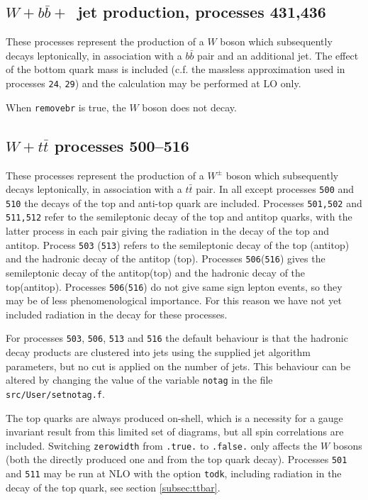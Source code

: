 \documentclass[12pt]{article}
\begin{document}
\subsection{$W+b{\bar b}+$~jet production, processes 431,436}
\label{subsec:wbbjetmassive}

These processes represent the production of a $W$ boson which subsequently
decays leptonically, in association with a $b{\bar b}$ pair and an
additional jet. The effect of the bottom quark mass is included (c.f. the massless approximation
used in processes {\tt 24}, {\tt 29})
and the calculation may be performed at LO only.

When {\tt removebr} is true, the $W$ boson does not decay.

\subsection{$W+t{\bar t}$ processes 500--516}
\label{subsec:wttdecay}

These processes represent the production of a $W^\pm$ boson which subsequently
decays leptonically, in association with a $t{\bar t}$ pair. In all except processes 
{\tt 500} and {\tt 510} the decays of the top and anti-top quark are included.
Processes {\tt 501,502} and {\tt 511,512} refer to the semileptonic decay of the top and antitop quarks,
with the latter process in each pair giving the radiation in the decay of the top and antitop.
Process {\tt 503} ({\tt 513}) refers to the semileptonic decay of the top (antitop)
and the hadronic decay of the antitop (top). Processes {\tt 506}({\tt 516}) gives the semileptonic
decay of the antitop(top) and the hadronic decay of the top(antitop).  Processes {\tt 506}({\tt 516}) 
do not give same sign lepton events, so they may be of less phenomenological importance. For this reason 
we have not yet included radiation in the decay for these processes. 

For processes {\tt 503}, {\tt 506}, {\tt 513}
and {\tt 516} the default behaviour is that the hadronic decay products
are clustered into jets using the supplied jet
algorithm parameters, but no cut is applied on the number of jets.
This behaviour can be altered by changing the value of the
variable {\tt notag} in the file {\tt src/User/setnotag.f}.

The top quarks are always
produced on-shell, which is a necessity for a gauge invariant result
from this limited set of diagrams, but all spin correlations are included.
Switching {\tt zerowidth} from {\tt .true.} to {\tt .false.} only affects
the $W$ bosons (both the directly produced one and from the top quark decay).
Processes {\tt 501} and {\tt 511} may be run at NLO with the option {\tt todk},
including radiation in the decay of the top quark, see section \ref{subsec:ttbar}.
\end{document}

